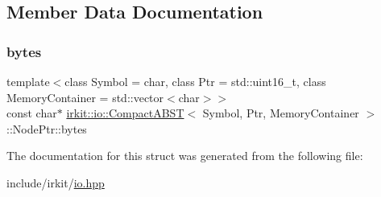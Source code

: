 \subsection{Member Data Documentation}
\mbox{\label{structirkit_1_1io_1_1CompactABST_1_1NodePtr_abfda312190220ac1265fe00a6317d371}} 
\subsubsection{\texorpdfstring{bytes}{bytes}}
{\footnotesize\ttfamily template$<$class Symbol = char, class Ptr = std\+::uint16\+\_\+t, class Memory\+Container = std\+::vector$<$char$>$$>$ \\
const char$\ast$ \mbox{\hyperlink{classirkit_1_1io_1_1CompactABST}{irkit\+::io\+::\+Compact\+A\+B\+ST}}$<$ Symbol, Ptr, Memory\+Container $>$\+::Node\+Ptr\+::bytes}



The documentation for this struct was generated from the following file\+:\begin{DoxyCompactItemize}
\item 
include/irkit/\mbox{\hyperlink{io_8hpp}{io.\+hpp}}\end{DoxyCompactItemize}
